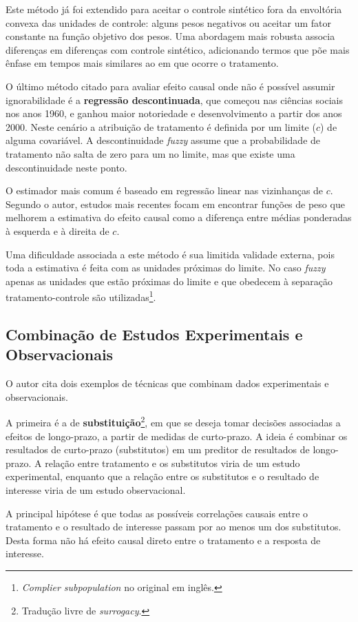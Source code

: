 \documentclass[final,5p]{elsarticle}
\numberwithin{equation}{section}
\begin{document}
    Este método já foi extendido para aceitar o controle sintético fora da envoltória convexa das unidades de controle: alguns pesos negativos ou aceitar um fator constante na função objetivo dos pesos. Uma abordagem mais robusta associa diferenças em diferenças com controle sintético, adicionando termos que põe mais ênfase em tempos mais similares ao em que ocorre o tratamento.

    O último método citado para avaliar efeito causal onde não é possível assumir ignorabilidade é a \textbf{regressão descontinuada}, que começou nas ciências sociais nos anos 1960, e ganhou maior notoriedade e desenvolvimento a partir dos anos 2000. Neste cenário a atribuição de tratamento é definida por um limite ($c$) de alguma covariável. A descontinuidade \textit{fuzzy} assume que a probabilidade de tratamento não salta de zero para um no limite, mas que existe uma descontinuidade neste ponto.

    O estimador mais comum é baseado em regressão linear nas vizinhanças de $c$. Segundo o autor, estudos mais recentes focam em encontrar funções de peso que melhorem a estimativa do efeito causal como a diferença entre médias ponderadas à esquerda e à direita de $c$.

    Uma dificuldade associada a este método é sua limitida validade externa, pois toda a estimativa é feita com as unidades próximas do limite. No caso \textit{fuzzy} apenas as unidades que estão próximas do limite e que obedecem à separação tratamento-controle são utilizadas\footnote{\textit{Complier subpopulation} no original em inglês.}.

    \subsection{Combinação de Estudos Experimentais e Observacionais}

    O autor cita dois exemplos de técnicas que combinam dados experimentais e observacionais.

    A primeira é a de \textbf{substituição}\footnote{Tradução livre de \textit{surrogacy}.}, em que se deseja tomar decisões associadas a efeitos de longo-prazo, a partir de medidas de curto-prazo. A ideia é combinar os resultados de curto-prazo (substitutos) em um preditor de resultados de longo-prazo. A relação entre tratamento e os substitutos viria de um estudo experimental, enquanto que a relação entre os substitutos e o resultado de interesse viria de um estudo observacional.

    A principal hipótese é que todas as possíveis correlações causais entre o tratamento e o resultado de interesse passam por ao menos um dos substitutos. Desta forma não há efeito causal direto entre o tratamento e a resposta de interesse.
\end{document}
